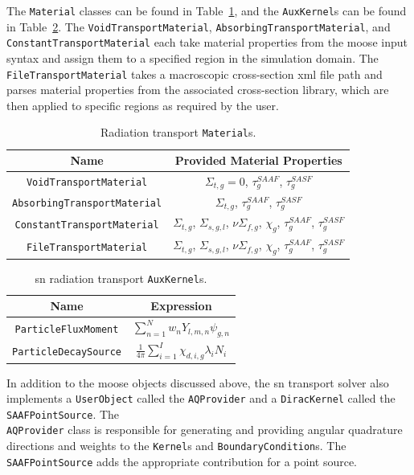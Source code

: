 The \texttt{Material} classes can be found in Table~\ref{table:transport_materials}, and the \texttt{AuxKernel}s can be found in Table~\ref{table:transport_aux_kernels}. The \texttt{VoidTransportMaterial}, \texttt{AbsorbingTransportMaterial}, and \texttt{ConstantTransportMaterial} each take material properties from the \acrshort{moose} input syntax and assign them to a specified region in the simulation domain. The \texttt{FileTransportMaterial} takes a macroscopic cross-section \acrshort{xml} file path and parses material properties from the associated cross-section library, which are then applied to specific regions as required by the user. 
\begin{table}[H]
    \centering
    \caption{Radiation transport \texttt{Material}s.}
    \begin{tabular}{|c|c|}
        \hline
        \textbf{Name} & \textbf{Provided Material Properties}\\
        \hline
        \texttt{VoidTransportMaterial} & $\Sigma_{t,g} = 0$, $\tau^{SAAF}_{g}$, $\tau^{SASF}_{g}$\\
        \texttt{AbsorbingTransportMaterial} & $\Sigma_{t,g}$, $\tau^{SAAF}_{g}$, $\tau^{SASF}_{g}$ \\
        \texttt{ConstantTransportMaterial} & $\Sigma_{t,g}$, $\Sigma_{s,g,l}$, $\nu\Sigma_{f,g}$, $\chi_{g}$, $\tau^{SAAF}_{g}$, $\tau^{SASF}_{g}$ \\
        \texttt{FileTransportMaterial} & $\Sigma_{t,g}$, $\Sigma_{s,g,l}$, $\nu\Sigma_{f,g}$, $\chi_{g}$, $\tau^{SAAF}_{g}$, $\tau^{SASF}_{g}$ \\
        \hline
    \end{tabular}
    \label{table:transport_materials}
\end{table}
\begin{table}[H]
    \centering
    \caption{\acrshort{sn} radiation transport \texttt{AuxKernel}s.}
    \begin{tabular}{|c|c|}
        \hline
        \textbf{Name} & \textbf{Expression}\\
        \hline
        \texttt{ParticleFluxMoment} & $\sum_{n = 1}^{N} w_{n} Y_{l,m,n}\psi_{g,n}$ \\
        \texttt{ParticleDecaySource} & $\frac{1}{4\pi}\sum_{i = 1}^{I} \chi_{d,i,g}\lambda_{i}N_{i}$ \\
        \hline
    \end{tabular}
    \label{table:transport_aux_kernels}
\end{table}
In addition to the \acrshort{moose} objects discussed above, the \acrshort{sn} transport solver also implements a \texttt{UserObject} called the \texttt{AQProvider} and a \texttt{DiracKernel} called the \texttt{SAAFPointSource}. The \\\texttt{AQProvider} class is responsible for generating and providing angular quadrature directions and weights to the \texttt{Kernel}s and \texttt{BoundaryCondition}s. The \texttt{SAAFPointSource} adds the appropriate contribution for a point source.

